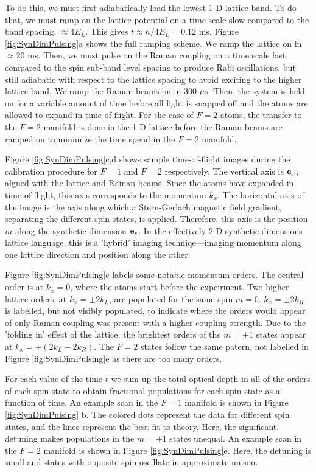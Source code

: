 To do this, we must first adiabatically load the lowest 1-D lattice band. To do that, we must ramp on the lattice potential on a time scale slow compared to the band spacing, $\approx 4 E_L$. This gives $t\approx h/4E_L=0.12$ ms. Figure \ref{fig:SynDimPulsing}a shows the full ramping scheme. We ramp the lattice on in $\approx 20$ ms. Then, we must pulse on the Raman coupling on a time scale fast compared to the spin sub-band level spacing to produce Rabi oscillations, but still adiabatic with respect to the lattice spacing to avoid exciting to the higher lattice band. We ramp the Raman beams on in $300$ $\mu$s. Then, the system is held on for a variable amount of time before all light is snapped off and the atoms are allowed to expand in time-of-flight. For the case of $F=2$ atoms, the transfer to the $F=2$ manifold is done in the 1-D lattice before the Raman beams are ramped on to minimize the time spend in the $F=2$ manifold. 

Figure \ref{fig:SynDimPulsing}c,d shows sample time-of-flight images during the calibration procedure for $F=1$ and $F=2$ respectively. The vertical axis is ${\bf e}_x$, algned with the lattice and Raman beams. Since the atoms have expanded in time-of-flight, this axis corresponds to the momentum $k_x$. The horizontal axis of the image is the axis along which a Stern-Gerlach magnetic field gradient, separating the different spin states, is applied. Therefore, this axis is the position $m$ along the synthetic dimension ${\bf e}_s$. In the effectively 2-D synthetic dimensions lattice language, this is a 'hybrid' imaging techniqe---imaging momentum along one lattice direction and position along the other.  

Figure \ref{fig:SynDimPulsing}c labels some notable momentum orders. The central order is at $k_x=0$, where the atoms start before the expeirment. Two higher lattice orders, at $k_x=\pm2k_L$, are populated for the same spin $m=0$. $k_x=\pm2k_R$ is labelled, but not visibly populated, to indicate where the orders would appear of only Raman coupling was present with a higher coupling strength. Due to the 'folding in' effect of the lattice, the brightest orders of the $m=\pm 1$ states appear at $k_x=\pm (2k_L-2k_R)$. The $F=2$ states follow the same patern, not labelled in Figure \ref{fig:SynDimPulsing}e as there are too many orders.  

For each value of the time $t$ we sum up the total optical depth in all of the orders of each spin state to obtain fractional populations for each spin state as a function of time. An example scan in the $F=1$ manifold is shown in Figure \ref{fig:SynDimPulsing} b. The colored dots represent the data for different spin states, and the lines represent the best fit to theory. Here, the significant detuning makes populations in the $m=\pm 1$ states unequal. An example scan in the $F=2$ manifold is shown in Figure \ref{fig:SynDimPulsing}e. Here, the detuning is small and states with opposite spin oscillate in approximate unison.

